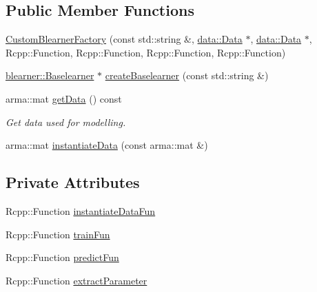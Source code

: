 \subsection*{Public Member Functions}
\begin{DoxyCompactItemize}
\item 
\mbox{\hyperlink{classblearnerfactory_1_1_custom_blearner_factory_a1a006cb772dc79cbcbcab810f5431b2c}{Custom\+Blearner\+Factory}} (const std\+::string \&, \mbox{\hyperlink{classdata_1_1_data}{data\+::\+Data}} $\ast$, \mbox{\hyperlink{classdata_1_1_data}{data\+::\+Data}} $\ast$, Rcpp\+::\+Function, Rcpp\+::\+Function, Rcpp\+::\+Function, Rcpp\+::\+Function)
\item 
\mbox{\hyperlink{classblearner_1_1_baselearner}{blearner\+::\+Baselearner}} $\ast$ \mbox{\hyperlink{classblearnerfactory_1_1_custom_blearner_factory_aad915d1ac58a323d1584d27f8cdace56}{create\+Baselearner}} (const std\+::string \&)
\item 
arma\+::mat \mbox{\hyperlink{classblearnerfactory_1_1_custom_blearner_factory_a53db4c5d9eb3875241bb47a8d73744e2}{get\+Data}} () const
\begin{DoxyCompactList}\small\item\em Get data used for modelling. \end{DoxyCompactList}\item 
arma\+::mat \mbox{\hyperlink{classblearnerfactory_1_1_custom_blearner_factory_aac818f8969820d37ec1a391abbb996da}{instantiate\+Data}} (const arma\+::mat \&)
\end{DoxyCompactItemize}
\subsection*{Private Attributes}
\begin{DoxyCompactItemize}
\item 
Rcpp\+::\+Function \mbox{\hyperlink{classblearnerfactory_1_1_custom_blearner_factory_a4237eeedc4a844cd02c52671a1f9191f}{instantiate\+Data\+Fun}}
\item 
Rcpp\+::\+Function \mbox{\hyperlink{classblearnerfactory_1_1_custom_blearner_factory_ac342da04b06c4e707811e4b312ce6c61}{train\+Fun}}
\item 
Rcpp\+::\+Function \mbox{\hyperlink{classblearnerfactory_1_1_custom_blearner_factory_a6cf80331e6ce5d8cabb25d7af09f9eea}{predict\+Fun}}
\item 
Rcpp\+::\+Function \mbox{\hyperlink{classblearnerfactory_1_1_custom_blearner_factory_a4db9694f117bf43facdb7522d8cd0de1}{extract\+Parameter}}
\end{DoxyCompactItemize}
